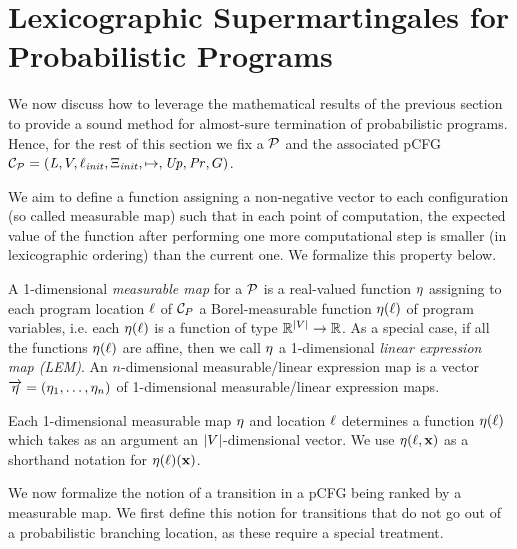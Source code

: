\section{Lexicographic Supermartingales for Probabilistic Programs}
\label{sec:lex-programs}

We now discuss how to leverage the mathematical results of the previous section 
to provide a sound method for almost-sure termination of probabilistic 
programs. Hence, for the rest of this section we fix a \PP{} $\mathcal{P}$ and the 
associated pCFG 
$\mathcal{C}_{\mathcal{P}}=(\mathit{L},V,\ell_{\mathit{init}},\Xi_{\mathit{init}},\mapsto,\mathit{Up},\mathit{Pr},G)$.

We aim to define a function assigning a non-negative vector to each 
configuration (so called measurable map) such that in each point of 
computation, the expected value of the function after performing one more 
computational step is smaller (in lexicographic ordering) than the current one. 
We formalize this property below.

\begin{definition}
A 1-dimensional \emph{measurable map} for a \PP{} $\mathcal{P}$ is a  
real-valued function $\eta$ 
assigning to each program location $\ell$ of $\mathcal{C}_P$ a Borel-measurable function $\eta(\ell)$  of program variables, i.e. each $\eta(\ell)$  is a function of type $\mathbb{R}^{|V|}\rightarrow \mathbb{R}$. As a special case, if all the functions $\eta(\ell)$ are affine, then we call $\eta$ a 1-dimensional \emph{linear expression map (LEM)}. 
An $n$-dimensional measurable/linear expression map is a vector 
$\overrightarrow{\eta}=(\eta_1,\dots,\eta_n)$ of 1-dimensional 
measurable/linear expression maps. 
\end{definition}

Each 1-dimensional measurable map $\eta$ and location $\ell$ determines a function $\eta(\ell)$ 
which takes as an argument an $|V|$-dimensional vector. We use $\eta(\ell,\mathbf{x})$ as a shorthand 
notation for $\eta(\ell)(\mathbf{x})$.

We now formalize the notion of a transition in a pCFG being ranked by a 
measurable map. We first define this notion for transitions that do not go out 
of a probabilistic branching location, as these require a special treatment.

